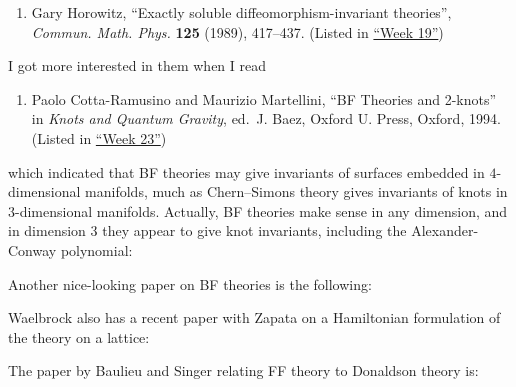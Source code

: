 \documentclass{article}
\def\tightlist{}
\renewcommand{\texttt}[1]{%
  \begingroup
  \ttfamily
  \begingroup\lccode`~=`/\lowercase{\endgroup\def~}{/\discretionary{}{}{}}%
  \begingroup\lccode`~=`[\lowercase{\endgroup\def~}{[\discretionary{}{}{}}%
  \begingroup\lccode`~=`.\lowercase{\endgroup\def~}{.\discretionary{}{}{}}%
  \catcode`/=\active\catcode`[=\active\catcode`.=\active
  \scantokens{#1\noexpand}%
  \endgroup
}
\begin{document}
\begin{enumerate}
\def\labelenumi{\arabic{enumi})}
\tightlist
\item
Gary Horowitz, ``Exactly soluble diffeomorphism-invariant theories'',
\emph{Commun. Math. Phys.} \textbf{125} (1989), 417--437. (Listed in
\protect\hyperlink{week19}{``Week 19''})
\end{enumerate}
\noindent
I got more interested in them when I read

\begin{enumerate}
\def\labelenumi{\arabic{enumi})}
\setcounter{enumi}{1}
\tightlist
\item
Paolo Cotta-Ramusino and Maurizio
Martellini, ``BF Theories and 2-knots'' in \emph{Knots and Quantum Gravity}, ed.~J. Baez,
Oxford U. Press, Oxford, 1994.  (Listed in \protect\hyperlink{week23}{``Week 23''})
\end{enumerate}
\noindent
which indicated that BF theories may give invariants of surfaces
embedded in \(4\)-dimensional manifolds, much as Chern--Simons theory
gives invariants of knots in \(3\)-dimensional manifolds. Actually, BF
theories make sense in any dimension, and in dimension 3 they appear to
give knot invariants, including the Alexander-Conway polynomial:

\noindent
Another nice-looking paper on BF theories is the following:

\noindent
Waelbrock also has a recent paper with Zapata on a Hamiltonian
formulation of the theory on a lattice:

\noindent
The paper by Baulieu and Singer relating FF theory to Donaldson theory
is:
\end{document}

